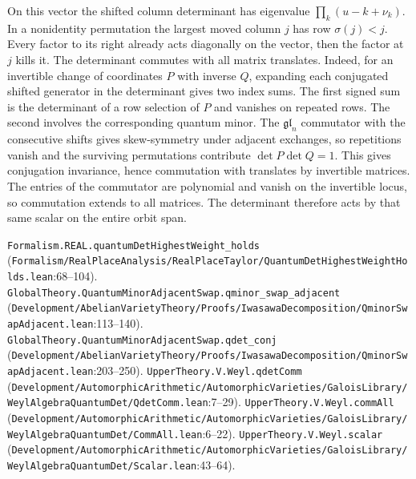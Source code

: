 On this vector the shifted column determinant has eigenvalue $\prod_k(u-k+\nu_k)$. In a nonidentity permutation the largest moved column $j$ has row $\sigma(j)<j$. Every factor to its right already acts diagonally on the vector, then the factor at $j$ kills it. The determinant commutes with all matrix translates. Indeed, for an invertible change of coordinates $P$ with inverse $Q$, expanding each conjugated shifted generator in the determinant gives two index sums. The first signed sum is the determinant of a row selection of $P$ and vanishes on repeated rows. The second involves the corresponding quantum minor. The $\mathfrak{gl}_n$ commutator with the consecutive shifts gives skew-symmetry under adjacent exchanges, so repetitions vanish and the surviving permutations contribute $\det P\det Q=1$. This gives conjugation invariance, hence commutation with translates by invertible matrices. The entries of the commutator are polynomial and vanish on the invertible locus, so commutation extends to all matrices. The determinant therefore acts by that same scalar on the entire orbit span.
\par{\footnotesize \nolinkurl{Formalism.REAL.quantumDetHighestWeight_holds} (\nolinkurl{Formalism/RealPlaceAnalysis/RealPlaceTaylor/QuantumDetHighestWeightHolds.lean}\allowbreak:68--104). \nolinkurl{GlobalTheory.QuantumMinorAdjacentSwap.qminor_swap_adjacent} (\nolinkurl{Development/AbelianVarietyTheory/Proofs/IwasawaDecomposition/QminorSwapAdjacent.lean}\allowbreak:113--140). \nolinkurl{GlobalTheory.QuantumMinorAdjacentSwap.qdet_conj} (\nolinkurl{Development/AbelianVarietyTheory/Proofs/IwasawaDecomposition/QminorSwapAdjacent.lean}\allowbreak:203--250). \nolinkurl{UpperTheory.V.Weyl.qdetComm} (\nolinkurl{Development/AutomorphicArithmetic/AutomorphicVarieties/GaloisLibrary/WeylAlgebraQuantumDet/QdetComm.lean}\allowbreak:7--29). \nolinkurl{UpperTheory.V.Weyl.commAll} (\nolinkurl{Development/AutomorphicArithmetic/AutomorphicVarieties/GaloisLibrary/WeylAlgebraQuantumDet/CommAll.lean}\allowbreak:6--22). \nolinkurl{UpperTheory.V.Weyl.scalar} (\nolinkurl{Development/AutomorphicArithmetic/AutomorphicVarieties/GaloisLibrary/WeylAlgebraQuantumDet/Scalar.lean}\allowbreak:43--64).\par}

